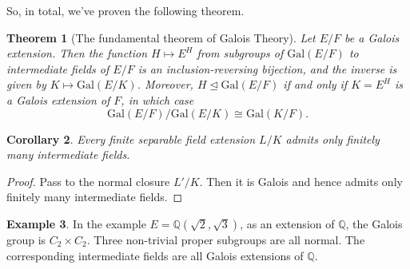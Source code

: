 \documentclass[12pt]{report}
\newtheorem{thm}{Theorem}[section]
\newtheorem{cor}[thm]{Corollary}
\theoremstyle{definition}
\newtheorem{example}[thm]{Example}
\def\QQ{\mathbb{Q}}
\def\Gal{\text{Gal}}
\begin{document}
So, in total, we've proven the following theorem.

\begin{thm}[The fundamental theorem of Galois Theory]\label{galois}
    Let $E/F$ be a Galois extension. Then the function $H \mapsto E^H$ from subgroups of $\Gal(E/F)$ to intermediate fields of $E/F$ is an inclusion-reversing bijection, and the inverse is given by $K \mapsto \Gal(E/K)$. Moreover, $H \trianglelefteq \Gal(E/F)$ if and only if $K = E^H$ is a Galois extension of $F$, in which case $$\Gal(E/F)/\Gal(E/K) \cong \Gal(K/F).$$
\end{thm}

\begin{cor}
    Every finite separable field extension $L/K$ admits only finitely many intermediate fields.
\end{cor}

\begin{proof}
    Pass to the normal closure $L'/K$. Then it is Galois and hence admits only finitely many intermediate fields. 
\end{proof}

\begin{example}
    In the example $E=\QQ(\sqrt{2},\sqrt{3})$, as an extension of $\QQ$, the Galois group is $C_2\times C_2$. Three non-trivial proper subgroups are all normal. The corresponding intermediate fields are all Galois extensions of $\QQ$.
\end{example}
\end{document}
